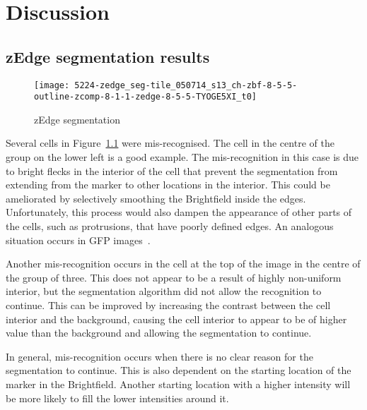 
\chapter{Discussion}

\ifpdf
    \graphicspath{{Chapter7/Figs/Raster/}{Chapter7/Figs/PDF/}{Chapter7/Figs/}}
\else
    \graphicspath{{Chapter7/Figs/Vector/}{Chapter7/Figs/}}
\fi

\section{zEdge segmentation results}

\begin{figure}[htbp!]
\centering
\texttt{[image: 5224-zedge\_seg-tile\_050714\_s13\_ch-zbf-8-5-5-outline-zcomp-8-1-1-zedge-8-5-5-TYOGE5XI\_t0]}
\caption{zEdge segmentation}
\label{fig:zedge_segmentation}
\end{figure}

Several cells in Figure~\ref{fig:zedge_segmentation} were mis-recognised. The cell in the centre of the group on the lower left is a good example. The mis-recognition in this case is due to bright flecks in the interior of the cell that prevent the segmentation from extending from the marker to other locations in the interior. This could be ameliorated by selectively smoothing the Brightfield inside the edges. Unfortunately, this process would also dampen the appearance of other parts of the cells, such as protrusions, that have poorly defined edges. An analogous situation occurs in GFP images~\cite{arce}.

Another mis-recognition occurs in the cell at the top of the image in the centre of the group of three. This does not appear to be a result of highly non-uniform interior, but the segmentation algorithm did not allow the recognition to continue. This can be improved by increasing the contrast between the cell interior and the background, causing the cell interior to appear to be of higher value than the background and allowing the segmentation to continue.

In general, mis-recognition occurs when there is no clear reason for the segmentation to continue. This is also dependent on the starting location of the marker in the Brightfield. Another starting location with a higher intensity will be more likely to fill the lower intensities around it.

